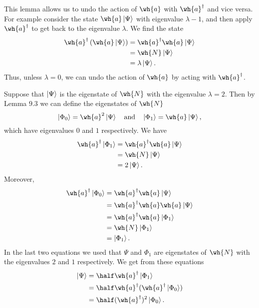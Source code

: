 \documentclass[12pt, a4paper]{article}
\begin{document}
\begin{mdnote}
    This lemma allows us to undo the action of \(\wh{a}\) with \(\wh{a}^{\dagger}\) and vice versa. For example consider the state \(\wh{a}\ket{\Psi}\) with eigenvalue \(\lambda-1\), and then apply \(\wh{a}^{\dagger}\) to get back to the eigenvalue \(\lambda\). We find the state 
    \[\begin{aligned}
        \wh{a}^{\dagger} \left( \wh{a}\ket{\Psi} \right) &= \wh{a}^{\dagger}\wh{a}\ket{\Psi} \\
        &= \wh{N} \ket{\Psi} \\
        &= \lambda \ket{\Psi}.
    \end{aligned}\]
    Thus, unless \(\lambda=0\), we can undo the action of \(\wh{a}\) by acting with \(\wh{a}^{\dagger}\).
\end{mdnote}

\begin{mdexample}
    Suppose that \(\ket{\Psi}\) is the eigenstate of \(\wh{N}\) with the eigenvalue \(\lambda =2\). Then by Lemma \(9.3\) we can define the eigenstates of \(\wh{N}\)
    \[\ket{\Phi_0} = \wh{a}^2 \ket{\Psi} \quad \text{and} \quad \ket{\Phi_1}=\wh{a}\ket{\Psi},\]
    which have eigenvalues \(0\) and \(1\) respectively. We have 
    \[\begin{aligned}
        \wh{a}^{\dagger} \ket{\Phi_1} &= \wh{a}^{\dagger}\wh{a}\ket{\Psi} \\
        &= \wh{N}\ket{\Psi} \\
        &= 2\ket{\Psi}.
    \end{aligned}\]
    Moreover,
    \[\begin{aligned}
        \wh{a}^{\dagger} \ket{\Phi_0} &= \wh{a}^{\dagger} \wh{a}\ket{\Psi} \\
        &= \wh{a}^{\dagger}\wh{a}\wh{a}\ket{\Psi} \\
        &= \wh{a}^{\dagger}\wh{a}\ket{\Phi_1} \\
        &= \wh{N} \ket{\Phi_1} \\
        &= \ket{\Phi_1}.
    \end{aligned}\]
    In the last two equations we used that \(\Psi\) and \(\Phi_1\) are eigenstates of \(\wh{N}\) with the eigenvalues \(2\) and \(1\) respectively. We get from these equations 
    \[\begin{aligned}
        \ket{\Psi} &= \half \wh{a}^{\dagger} \ket{\Phi_1} \\
        &= \half \wh{a}^{\dagger} (\wh{a}^{\dagger}\ket{\Phi_0}) \\
        &= \half (\wh{a}^{\dagger})^2 \ket{\Phi_0}.
    \end{aligned}\]
\end{mdexample}
\end{document}
